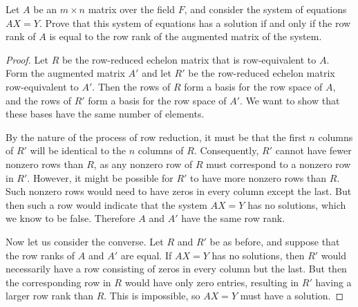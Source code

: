  Let $A$ be an $m\times n$ matrix over the field $F$, and
consider the system of equations $AX = Y$. Prove that this system of
equations has a solution if and only if the row rank of $A$ is equal
to the row rank of the augmented matrix of the system.
\begin{proof}
  Let $R$ be the row-reduced echelon matrix that is row-equivalent to
  $A$. Form the augmented matrix $A'$ and let $R'$ be the row-reduced
  echelon matrix row-equivalent to $A'$. Then the rows of $R$ form a
  basis for the row space of $A$, and the rows of $R'$ form a basis
  for the row space of $A'$. We want to show that these bases have the
  same number of elements.

  By the nature of the process of row reduction, it must be that the
  first $n$ columns of $R'$ will be identical to the $n$ columns of
  $R$. Consequently, $R'$ cannot have fewer nonzero rows than $R$, as
  any nonzero row of $R$ must correspond to a nonzero row in
  $R'$. However, it might be possible for $R'$ to have more nonzero
  rows than $R$. Such nonzero rows would need to have zeros in every
  column except the last. But then such a row would indicate that the
  system $AX = Y$ has no solutions, which we know to be
  false. Therefore $A$ and $A'$ have the same row rank.

  Now let us consider the converse. Let $R$ and $R'$ be as before, and
  suppose that the row ranks of $A$ and $A'$ are equal. If $AX = Y$
  has no solutions, then $R'$ would necessarily have a row consisting
  of zeros in every column but the last. But then the corresponding
  row in $R$ would have only zero entries, resulting in $R'$ having a
  larger row rank than $R$. This is impossible, so $AX = Y$ must have
  a solution.
\end{proof}
